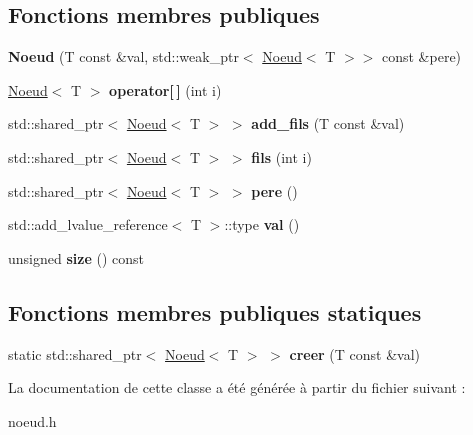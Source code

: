 \subsection*{Fonctions membres publiques}
\begin{DoxyCompactItemize}
\item 
{\bfseries Noeud} (T const \&val, std\+::weak\+\_\+ptr$<$ \hyperlink{classNoeud}{Noeud}$<$ T $>$$>$ const \&pere)\hypertarget{classNoeud_a1da54304cf1cb3ef8b185fddb392958a}{}\label{classNoeud_a1da54304cf1cb3ef8b185fddb392958a}

\item 
\hyperlink{classNoeud}{Noeud}$<$ T $>$ {\bfseries operator\mbox{[}$\,$\mbox{]}} (int i)\hypertarget{classNoeud_ac15ebbd02aaff1c7ea6238617431e11f}{}\label{classNoeud_ac15ebbd02aaff1c7ea6238617431e11f}

\item 
std\+::shared\+\_\+ptr$<$ \hyperlink{classNoeud}{Noeud}$<$ T $>$ $>$ {\bfseries add\+\_\+fils} (T const \&val)\hypertarget{classNoeud_a6a494c4a2e3d844addfd3af6e65d527d}{}\label{classNoeud_a6a494c4a2e3d844addfd3af6e65d527d}

\item 
std\+::shared\+\_\+ptr$<$ \hyperlink{classNoeud}{Noeud}$<$ T $>$ $>$ {\bfseries fils} (int i)\hypertarget{classNoeud_ae968b7fe5d1c060ff61e8ab383a106b8}{}\label{classNoeud_ae968b7fe5d1c060ff61e8ab383a106b8}

\item 
std\+::shared\+\_\+ptr$<$ \hyperlink{classNoeud}{Noeud}$<$ T $>$ $>$ {\bfseries pere} ()\hypertarget{classNoeud_a226193dbebac6cf5e8bd55bf47f6bf75}{}\label{classNoeud_a226193dbebac6cf5e8bd55bf47f6bf75}

\item 
std\+::add\+\_\+lvalue\+\_\+reference$<$ T $>$\+::type {\bfseries val} ()\hypertarget{classNoeud_a76f29413cf4c786bb1aa8be13aed2276}{}\label{classNoeud_a76f29413cf4c786bb1aa8be13aed2276}

\item 
unsigned {\bfseries size} () const \hypertarget{classNoeud_a8b1d01e51a0917ec172d57c2afa2f31c}{}\label{classNoeud_a8b1d01e51a0917ec172d57c2afa2f31c}

\end{DoxyCompactItemize}
\subsection*{Fonctions membres publiques statiques}
\begin{DoxyCompactItemize}
\item 
static std\+::shared\+\_\+ptr$<$ \hyperlink{classNoeud}{Noeud}$<$ T $>$ $>$ {\bfseries creer} (T const \&val)\hypertarget{classNoeud_a53503e6bae571316d778c39214693710}{}\label{classNoeud_a53503e6bae571316d778c39214693710}

\end{DoxyCompactItemize}


La documentation de cette classe a été générée à partir du fichier suivant \+:\begin{DoxyCompactItemize}
\item 
noeud.\+h\end{DoxyCompactItemize}
